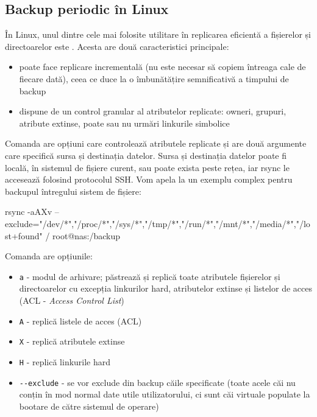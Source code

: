 \subsection{Backup periodic în Linux}
\label{sec:storage:backup:linux}

În Linux, unul dintre cele mai folosite utilitare în
replicarea eficientă a fișierelor și directoarelor este . Acesta are
două caracteristici principale:

\begin{itemize}
  \item poate face replicare incrementală (nu este necesar să copiem
    întreaga cale de fiecare dată), ceea ce duce la o îmbunătățire
    semnificativă a timpului de backup
  \item dispune de un control granular al atributelor replicate: owneri,
    grupuri, atribute extinse, poate sau nu urmări linkurile
    simbolice
\end{itemize}

Comanda  are opțiuni care controlează atributele
replicate și are două argumente care specifică sursa și destinația datelor.
Sursa și destinația datelor poate fi locală, în sistemul de fișiere curent, sau
poate exista peste rețea, iar rsync le accesează folosind protocolul SSH. Vom
apela la un exemplu complex pentru backupul întregului sistem de fișiere:
\begin{screen}
rsync -aAXv --exclude={"/dev/*","/proc/*","/sys/*","/tmp/*","/run/*","/mnt/*","/media/*","/lost+found"} / root@nas:/backup
\end{screen}

Comanda  are opțiunile:

\begin{itemize}
  \item \texttt{a} - modul de arhivare; păstrează și replică toate atributele
    fișierelor și directoarelor cu excepția linkurilor hard,
                atributelor extinse și listelor de acces (ACL - \textit{Access Control List})
  \item \texttt{A} - replică listele de acces (ACL)
  \item \texttt{X} - replică atributele extinse
  \item \texttt{H} - replică linkurile hard
  \item \texttt{-{}-exclude} - se vor exclude din backup căile specificate (toate
    acele căi nu conțin în mod normal date utile utilizatorului, ci
    sunt căi virtuale populate la bootare de către sistemul de
    operare)
\end{itemize}

